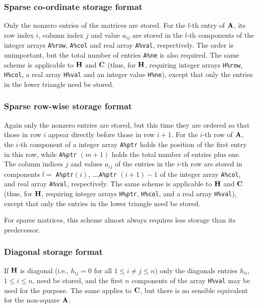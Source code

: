 \documentclass{galahad}
\begin{document}
\subsubsection{Sparse co-ordinate storage format}\label{coordinate}
Only the nonzero entries of the matrices are stored. For the
$l$-th entry of ${\mathbf{A}}$, its row index $i$, column index $j$
and value $a_{ij}$
are stored in the $l$-th components of the integer arrays {\tt A\%row},
{\tt A\%col} and real array {\tt A\%val}, respectively.
The order is unimportant, but the total
number of entries {\tt A\%ne} is also required.
The same scheme is applicable to ${\mathbf{H}}$ and ${\mathbf{C}}$
(thus, for ${\mathbf{H}}$, requiring integer arrays {\tt H\%row}, {\tt H\%col}, a real
array  {\tt H\%val} and an integer value {\tt H\%ne}),
except that only the entries in the lower triangle need be stored.

\subsubsection{Sparse row-wise storage format}\label{rowwise}
Again only the nonzero entries are stored, but this time
they are ordered so that those in row $i$ appear directly before those
in row $i+1$. For the $i$-th row of ${\mathbf{A}}$, the $i$-th component of a
integer array {\tt A\%ptr} holds the position of the first entry in this row,
while {\tt A\%ptr} $(m+1)$ holds the total number of entries plus one.
The column indices $j$ and values $a_{ij}$ of the entries in the $i$-th row
are stored in components
$l =$ {\tt A\%ptr}$(i)$, \ldots ,{\tt A\%ptr} $(i+1)-1$ of the
integer array {\tt A\%col}, and real array {\tt A\%val}, respectively.
The same scheme is applicable to
${\mathbf{H}}$ and ${\mathbf{C}}$ (thus, for ${\mathbf{H}}$,
requiring integer arrays {\tt H\%ptr}, {\tt H\%col}, and
a real array {\tt H\%val}),
except that only the entries in the lower triangle need be stored.

For sparse matrices, this scheme almost always requires less storage than
its predecessor.

\subsubsection{Diagonal storage format}\label{diagonal}
If ${\mathbf{H}}$ is diagonal (i.e., $h_{ij} = 0$ for all $1 \leq i \neq j \leq n$)
only the diagonals entries $h_{ii}$, $1 \leq i \leq n$,  need be stored,
and the first $n$ components of the array {\tt H\%val} may be used for
the purpose. The same applies to ${\mathbf{C}}$, but
there is no sensible equivalent for the non-square ${\mathbf{A}}$.
\end{document}
